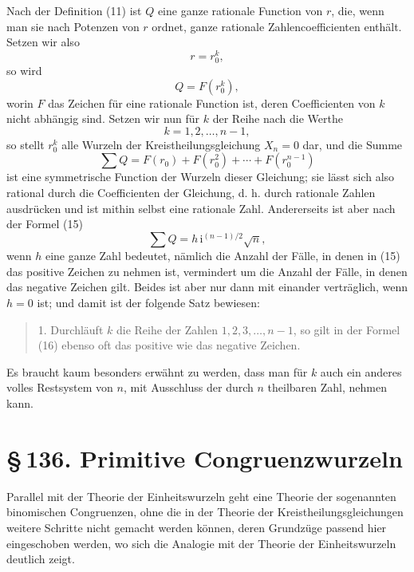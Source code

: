 \documentclass[11pt]{article}
\providecommand{\ii}{\mathrm{i}}
\providecommand{\sect}[2]{\section*{\S\,#1. #2}}
\begin{document}
Nach der Definition (11) ist $Q$ eine ganze rationale Function von $r$, die, wenn man sie nach Potenzen von $r$ ordnet, ganze rationale Zahlencoefficienten enthält. Setzen wir also
\[
        r=r_0^k,
\]
so wird
\[
        Q=F(r_0^k),
\]
worin $F$ das Zeichen für eine rationale Function ist, deren Coefficienten von $k$ nicht abhängig sind. Setzen wir nun für $k$ der Reihe nach die Werthe
\[
        k=1,2,\ldots,n-1,
\]
so stellt $r_0^k$ alle Wurzeln der Kreistheilungsgleichung $X_n=0$ dar, und die Summe
\[
        \sum Q=F(r_0)+F(r_0^2)+\cdots+F(r_0^{n-1})
\]
ist eine symmetrische Function der Wurzeln dieser Gleichung; sie lässt sich also rational durch die Coefficienten der Gleichung, d. h. durch rationale Zahlen ausdrücken und ist mithin selbst eine rationale Zahl. Andererseits ist aber nach der Formel (15)
\[
        \sum Q=h\,\ii^{(n-1)/2}\sqrt n,
\]
wenn $h$ eine ganze Zahl bedeutet, nämlich die Anzahl der Fälle, in denen in (15) das positive Zeichen zu nehmen ist, vermindert um die Anzahl der Fälle, in denen das negative Zeichen gilt. Beides ist aber nur dann mit einander verträglich, wenn $h=0$ ist; und damit ist der folgende Satz bewiesen:
\begin{quote}
1. Durchläuft $k$ die Reihe der Zahlen $1,2,3,\ldots,n-1$, so gilt in der Formel (16) ebenso oft das positive wie das negative Zeichen.
\end{quote}
Es braucht kaum besonders erwähnt zu werden, dass man für $k$ auch ein anderes volles Restsystem von $n$, mit Ausschluss der durch $n$ theilbaren Zahl, nehmen kann.

\sect{136}{Primitive Congruenzwurzeln}

Parallel mit der Theorie der Einheitswurzeln geht eine Theorie der sogenannten binomischen Congruenzen, ohne die in der Theorie der Kreistheilungsgleichungen weitere Schritte nicht gemacht werden können, deren Grundzüge passend hier eingeschoben werden, wo sich die Analogie mit der Theorie der Einheitswurzeln deutlich zeigt.
\end{document}

